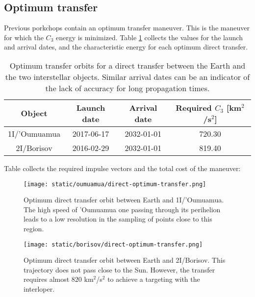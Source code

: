 \subsection{Optimum transfer}

Previous porkchops contain an optimum transfer maneuver. This is the maneuver
for which the $C_3$ energy is minimized. Table \ref{tab:direct-transfer-optimum}
collects the values for the launch and arrival dates, and the
characteristic energy for each optimum direct transfer.

\begin{table}[H]
  \centering
  \begin{tabular}{|c|c|c|c|}
    \hline
    Object & Launch date & Arrival date & Required $C_3$ [km$^2$/s$^2$] \\
    \hline
    1I/'Oumuamua & 2017-06-17 & 2032-01-01 & 720.30 \\
    2I/Borisov & 2016-02-29 & 2032-01-01 & 819.40 \\
    \hline
  \end{tabular}
  \caption{Optimum transfer orbits for a direct transfer between the Earth and the
    two interstellar objects. Similar arrival dates can be an indicator of the
    lack of accuracy for long propagation times.}
  \label{tab:direct-transfer-optimum}
\end{table}

Table collects the required impulse vectors and the total cost of the maneuver:



\begin{figure}[H]
  \centering
  \texttt{[image: static/oumuamua/direct-optimum-transfer.png]}
  \caption{Optimum direct transfer orbit between Earth and 1I/'Oumuamua. The
    high speed of 'Oumuamua one passing through its perihelion leads to a low
    resolution in the sampling of points close to this region.}
  \label{fig:oumuamua-direct-transfer-orbit}
\end{figure}



\begin{figure}[H]
  \centering
  \texttt{[image: static/borisov/direct-optimum-transfer.png]}
  \caption{Optimum direct transfer orbit between Earth and 2I/Borisov. This
        trajectory does not pass close to the Sun. However, the transfer requires almost $820$
        km$^2$/s$^2$ to achieve a targeting with the interloper.}
  \label{fig:borisov-direct-transfer-orbit}
\end{figure}

